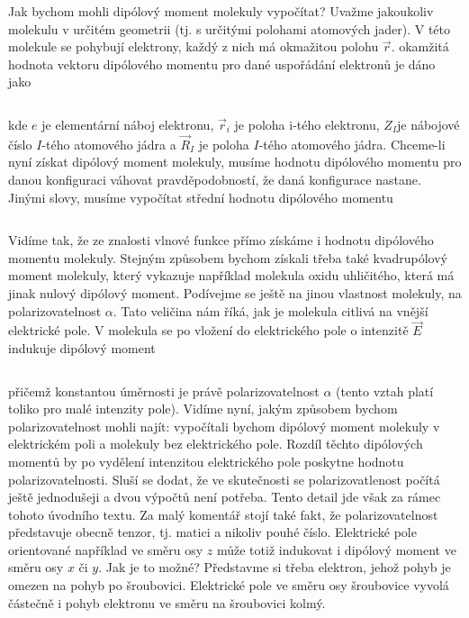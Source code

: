 Jak bychom mohli dipólový moment molekuly vypočítat? Uvažme jakoukoliv molekulu v určitém geometrii (tj. s určitými polohami atomových jader). V této molekule se pohybují elektrony, každý z nich má okmažitou polohu $\vec{r}$. okamžitá hodnota vektoru dipólového momentu pro dané uspořádání elektronů je dáno jako

\begin{equation}
\label{rov:XXX}
\end{equation}


\noindent kde $e$ je elementární náboj elektronu, $\vec{r}_i$ je poloha i-tého elektronu, $Z_I$je nábojové číslo $I$-tého atomového jádra a $\vec{R}_I$ je poloha $I$-tého atomového jádra. Chceme-li nyní získat dipólový moment molekuly, musíme hodnotu dipólového momentu pro danou konfiguraci váhovat pravděpodobností, že daná konfigurace nastane. Jinými slovy, musíme vypočítat střední hodnotu dipólového momentu

\begin{equation}
\label{rov:XXX}
\end{equation}

Vidíme tak, že ze znalosti vlnové funkce přímo získáme i hodnotu dipólového momentu molekuly. Stejným způsobem bychom získali třeba také kvadrupólový moment molekuly, který vykazuje například molekula oxidu uhličitého, která má jinak nulový dipólový moment. Podívejme se ještě na jinou vlastnost molekuly, na polarizovatelnost $\alpha$. Tato veličina nám říká, jak je molekula citlivá na vnější elektrické pole. V molekula se po vložení do elektrického pole o intenzitě $\vec{E}$ indukuje dipólový moment

\begin{equation}
\label{rov:XXX}
\end{equation}

\noindent přičemž konstantou úměrnosti je právě polarizovatelnost $\alpha$ (tento vztah platí toliko pro malé intenzity pole). Vidíme nyní, jakým způsobem bychom polarizovatelnost mohli najít: vypočítali bychom dipólový moment molekuly v elektrickém poli a molekuly bez elektrického pole. Rozdíl těchto dipólových momentů by po vydělení intenzitou elektrického pole poskytne hodnotu polarizovatelnosti. Sluší se dodat, že ve skutečnosti se polarizovatlenost počítá ještě jednodušeji a dvou výpočtů není potřeba. Tento detail jde však za rámec tohoto úvodního textu. Za malý komentář stojí také fakt, že polarizovatelnost představuje obecně tenzor, tj. matici a nikoliv pouhé číslo. Elektrické pole orientované například ve směru osy $z$ může totiž indukovat i dipólový moment ve směru osy $x$ či $y$. Jak je to možné? Představme si třeba elektron, jehož pohyb je omezen na pohyb po šroubovici. Elektrické pole ve směru osy šroubovice vyvolá částečně i pohyb elektronu ve směru na šroubovici kolmý. 

